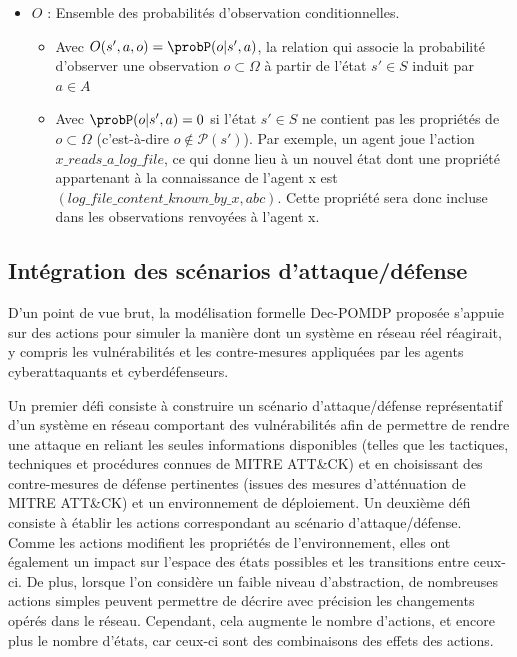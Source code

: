 \begin{itemize}
    \item $O$ : Ensemble des probabilités d'observation conditionnelles.
          \begin{itemize}
              \item Avec $O(s',a,o) = \probP(o|s',a)$, la relation qui associe la probabilité d'observer une observation $o \subset \Omega$ à partir de l'état $s' \in S$ induit par $a \in A$
              \item Avec $\probP(o|s',a) = 0$ si l'état $s' \in S$ ne contient pas les propriétés de $o \subset \Omega$ (c'est-à-dire $o \not\in \mathcal{P}(s')$). Par exemple, un agent joue l'action $x\_reads\_a\_log\_file$, ce qui donne lieu à un nouvel état dont une propriété appartenant à la connaissance de l'agent x est $(log\_file\_content\_known\_by\_x, \allowbreak abc)$. Cette propriété sera donc incluse dans les observations renvoyées à l'agent x.
          \end{itemize}

\end{itemize}


\subsection{Intégration des scénarios d'attaque/défense\label{sec:ad_integration}}

\noindent
D'un point de vue brut, la modélisation formelle Dec-POMDP proposée s'appuie sur des actions pour simuler la manière dont un système en réseau réel réagirait, y compris les vulnérabilités et les contre-mesures appliquées par les agents cyberattaquants et cyberdéfenseurs.

Un premier défi consiste à construire un scénario d'attaque/défense représentatif d'un système en réseau comportant des vulnérabilités afin de permettre de rendre une attaque en reliant les seules informations disponibles (telles que les tactiques, techniques et procédures connues de MITRE ATT\&CK) et en choisissant des contre-mesures de défense pertinentes (issues des mesures d'atténuation de MITRE ATT\&CK) et un environnement de déploiement. Un deuxième défi consiste à établir les actions correspondant au scénario d'attaque/défense. Comme les actions modifient les propriétés de l'environnement, elles ont également un impact sur l'espace des états possibles et les transitions entre ceux-ci.
De plus, lorsque l'on considère un faible niveau d'abstraction, de nombreuses actions simples peuvent permettre de décrire avec précision les changements opérés dans le réseau. Cependant, cela augmente le nombre d'actions, et encore plus le nombre d'états, car ceux-ci sont des combinaisons des effets des actions.

